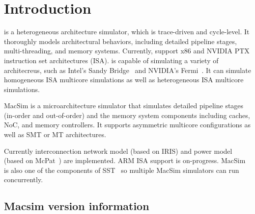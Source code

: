


\chapter{Introduction}


\SIM is a heterogeneous architecture simulator, which is trace-driven
and cycle-level. It thoroughly models architectural behaviors,
including detailed pipeline stages, multi-threading, and memory
systems. Currently, \SIM support x86 and NVIDIA PTX instruction set
architectures (ISA). \SIM is capable of simulating a variety of
architecreus, such as Intel's Sandy Bridge~\cite{sandybridge} and
NVIDIA's Fermi~\cite{fermi}.  It can simulate homogeneous ISA
multicore simulations as well as heterogeneous ISA multicore
simulations.

MacSim is a microarchitecture simulator that simulates detailed
pipeline stages (in-order and out-of-order) and the memory system components 
including caches, NoC, and memory controllers. It supports asymmetric 
multicore configurations as well as SMT or MT architectures.

Currently interconnection network model (based on IRIS) and power
model (based on McPat~\cite{mcpat}) are implemented. ARM ISA support is
on-progress. MacSim is also one of the components of SST~\cite{sst} so
multiple MacSim simulators can run concurrently.





\section*{Macsim version information}



